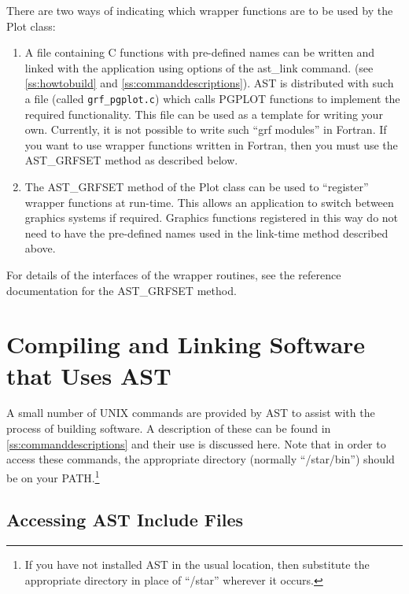 \documentclass[twoside,11pt]{article}
\newcommand{\htmlref}[2]{#1}
\newcommand{\appref}[1]{Appendix~\ref{#1}}
\newcommand{\secref}[1]{\S\ref{#1}}
\renewcommand{\appref}[1]{\ref{#1}}
\renewcommand{\secref}[1]{\ref{#1}}
\begin{document}
There are two ways of indicating which wrapper functions are to be used by 
the Plot class:
\begin{enumerate}

\item A file containing C functions with pre-defined names can be written
and linked with the application using options of the \htmlref{ast\_link}{ast_link} command.
(see \secref{ss:howtobuild} and \appref{ss:commanddescriptions}). AST is
distributed with such a file (called {\tt grf\_pgplot.c}) which calls PGPLOT 
functions to implement the required functionality. This file can be used
as a template for writing your own.
Currently, it is not possible to write such ``grf modules'' in Fortran.
If you want to use wrapper functions written in Fortran, then you must 
use the \htmlref{AST\_GRFSET}{AST_GRFSET} method as described below.

\item The 
AST\_GRFSET
method of the Plot class can be used to ``register''
wrapper functions at run-time. This allows an application to switch
between graphics systems if required. Graphics functions registered in
this way do not need to have the pre-defined names used in the link-time
method described above.

\end{enumerate}

For details of the interfaces of the wrapper routines, see 
the reference documentation for the AST\_GRFSET method.

\cleardoublepage
\section{Compiling and Linking Software that Uses AST}

A small number of UNIX commands are provided by AST to assist with the
process of building software. A description of these can be found in
\appref{ss:commanddescriptions} and their use is discussed here.  Note
that in order to access these commands, the appropriate directory
(normally ``/star/bin'') should be on your PATH.\footnote{If you have
not installed AST in the usual location, then substitute the
appropriate directory in place of ``/star'' wherever it occurs.}

\subsection{\label{ss:accessingheaderfile}Accessing AST Include Files}
\end{document}
